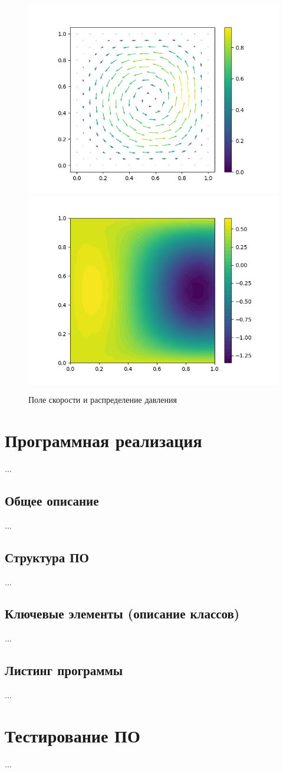 \documentclass[a4paper,10pt]{report}
\begin{document}
\begin{figure}
\centering
\includegraphics[width=0.49\linewidth]{shifted-vortex/u.png}
\includegraphics[width=0.49\linewidth]{shifted-vortex/p.png}
\label{fig:shifted-vortex}
\caption{Поле скорости и распределение давления}
\end{figure}

\section{Программная реализация}
...

\subsection{Общее описание}
...

\subsection{Структура ПО}
...

\subsection{Ключевые элементы (описание классов)}
...

\subsection{Листинг программы}
...

\section{Тестирование ПО}
...
\end{document}
